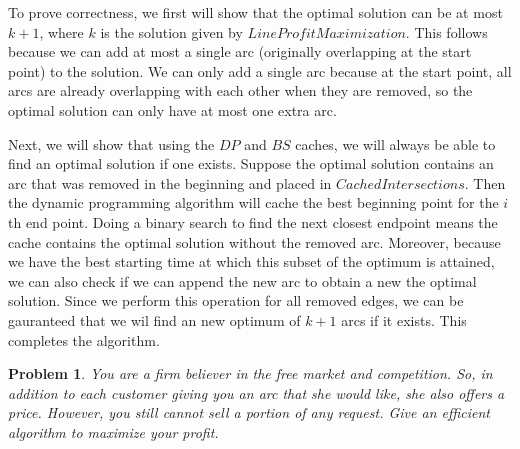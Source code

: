 \documentclass[psamsfonts]{amsart}
\newtheorem{prob}{Problem}[section]
\newenvironment{sol}{{\bfseries Solution}}{\qedsymbol}
\theoremstyle{definition}
\theoremstyle{remark}
\numberwithin{equation}{section}
\begin{document}
\begin{sol}
To prove correctness, we first will show that the optimal solution can be at most $k + 1$, where $k$ is the solution given by $LineProfitMaximization$. This follows because we can add at most a single arc (originally overlapping at the start point) to the solution. We can only add a single arc because at the start point, all arcs are already overlapping with each other when they are removed, so the optimal solution can only have at most one extra arc. 

Next, we will show that using the $DP$ and $BS$ caches, we will always be able to find an optimal solution if one exists. Suppose the optimal solution contains an arc that was removed in the beginning and placed in $CachedIntersections$. Then the dynamic programming algorithm will cache the best beginning point for the $i$th end point. Doing a binary search to find the next closest endpoint means the cache contains the optimal solution without the removed arc. Moreover, because we have the best starting time at which this subset of the optimum is attained, we can also check if we can append the new arc to obtain a new the optimal solution. Since we perform this operation for all removed edges, we can be gauranteed that we wil find an new optimum of $k+1$ arcs if it exists. This completes the algorithm. 

\end{sol}


\begin{prob}
You are a firm believer in the free market and competition. So, in addition to
each customer giving you an arc that she would like, she also offers a price.
However, you still cannot sell a portion of any request. Give an efficient
algorithm to maximize your profit.
\end{prob}
\end{document}
